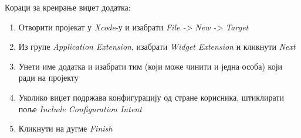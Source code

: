 \documentclass[12pt,oneside]{memoir}
\begin{document}
\indent Кораци за креирање виџет додатка:
\begin{enumerate}
    \item Отворити пројекат у \textit{Xcode}-у и изабрати \textit{File -> New -> Target}
    
    \item Из групе \textit{Application Extension}, изабрати \textit{Widget Extension} и кликнути \textit{Next}
    
    \item Унети име додатка и изабрати тим (који може чинити и једна особа) који ради на пројекту
    
    \item Уколико виџет подржава конфигурацију од стране корисника, штиклирати поље \textit{Include Configuration Intent}
    
    \item Кликнути на дугме \textit{Finish}
    
\end{enumerate}
\end{document}

